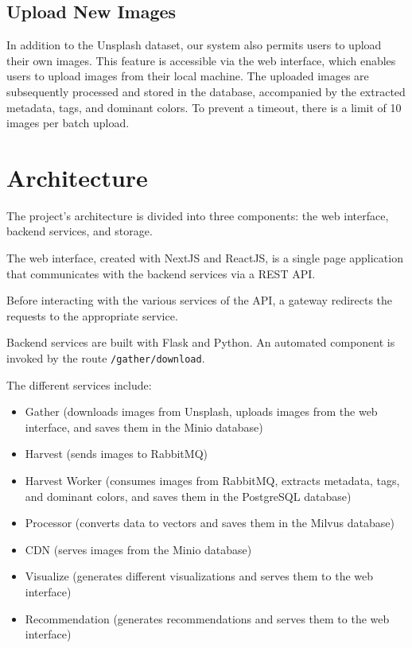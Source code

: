 \documentclass{article}
\begin{document}
    \subsection{Upload New Images}\label{subsec:upload_images}
    In addition to the Unsplash dataset, our system also permits users to upload their own images. This feature is accessible via the web interface, which enables users to upload images from their local machine. The uploaded images are subsequently processed and stored in the database, accompanied by the extracted metadata, tags, and dominant colors. To prevent a timeout, there is a limit of 10 images per batch upload.

    \section{Architecture}\label{sec:architecture}

    The project's architecture is divided into three components: the web interface, backend services, and storage.

    The web interface, created with NextJS and ReactJS, is a single page application that communicates with the backend services via a REST API.

    Before interacting with the various services of the API, a gateway redirects the requests to the appropriate service.

    Backend services are built with Flask and Python. An automated component is invoked by the route \texttt{/gather/download}.

    The different services include:
    \begin{itemize}
        \item Gather (downloads images from Unsplash, uploads images from the web interface, and saves them in the Minio database)
        \item Harvest (sends images to RabbitMQ)
        \item Harvest Worker (consumes images from RabbitMQ, extracts metadata, tags, and dominant colors, and saves them in the PostgreSQL database)
        \item Processor (converts data to vectors and saves them in the Milvus database)
        \item CDN (serves images from the Minio database)
        \item Visualize (generates different visualizations and serves them to the web interface)
        \item Recommendation (generates recommendations and serves them to the web interface)
    \end{itemize}
\end{document}

